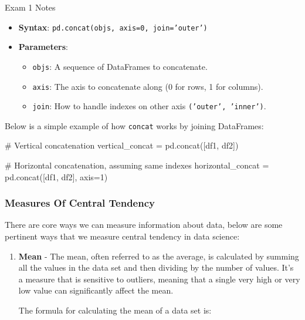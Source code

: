 \begin{examnotes}{Exam 1 Notes}
\begin{enumerate}
\begin{itemize}
            \item \textbf{Syntax}: \texttt{pd.concat(objs, axis=0, join='outer')}
            \item \textbf{Parameters}:
            \begin{itemize}
                \item \texttt{objs}: A sequence of DataFrames to concatenate.
                \item \texttt{axis}: The axis to concatenate along (0 for rows, 1 for columns).
                \item \texttt{join}: How to handle indexes on other axis \texttt{('outer', 'inner')}.
            \end{itemize}
        \end{itemize}
        \begin{highlight}
            Below is a simple example of how \texttt{concat} works by joining DataFrames:
    \begin{code}[Python]
    # Vertical concatenation
    vertical_concat = pd.concat([df1, df2])
    
    # Horizontal concatenation, assuming same indexes
    horizontal_concat = pd.concat([df1, df2], axis=1)        
    \end{code}
        \end{highlight}
    \end{enumerate}

    \subsubsection*{Measures Of Central Tendency}

    There are core ways we can measure information about data, below are some pertinent ways that we measure central tendency in data science:

    \begin{enumerate}
        \item \textbf{Mean} - The mean, often referred to as the average, is calculated by summing all the values in the data set and then dividing by the number of values. It's a measure that is 
        sensitive to outliers, meaning that a single very high or very low value can significantly affect the mean.

        The formula for calculating the mean of a data set is:


\end{enumerate}
\end{examnotes}
